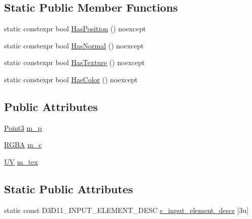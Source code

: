 \subsection*{Static Public Member Functions}
\begin{DoxyCompactItemize}
\item 
static constexpr bool \mbox{\hyperlink{structmage_1_1rendering_1_1_vertex_position_color_texture_a7e63de3d06cc4d0a9fb3f32cde764c9c}{Has\+Position}} () noexcept
\item 
static constexpr bool \mbox{\hyperlink{structmage_1_1rendering_1_1_vertex_position_color_texture_a3823f3163d8350e4c448e99e90cc9436}{Has\+Normal}} () noexcept
\item 
static constexpr bool \mbox{\hyperlink{structmage_1_1rendering_1_1_vertex_position_color_texture_a679323396203b9b47a6ef4c936c72d58}{Has\+Texture}} () noexcept
\item 
static constexpr bool \mbox{\hyperlink{structmage_1_1rendering_1_1_vertex_position_color_texture_a1d3db6f6fb5a93ce596e7157fc204f81}{Has\+Color}} () noexcept
\end{DoxyCompactItemize}
\subsection*{Public Attributes}
\begin{DoxyCompactItemize}
\item 
\mbox{\hyperlink{structmage_1_1_point3}{Point3}} \mbox{\hyperlink{structmage_1_1rendering_1_1_vertex_position_color_texture_a924a25377182f6c29ff7f50fba08113c}{m\+\_\+p}}
\item 
\mbox{\hyperlink{structmage_1_1_r_g_b_a}{R\+G\+BA}} \mbox{\hyperlink{structmage_1_1rendering_1_1_vertex_position_color_texture_acf8f36b78e8366edff1b476e2e97fec5}{m\+\_\+c}}
\item 
\mbox{\hyperlink{structmage_1_1_u_v}{UV}} \mbox{\hyperlink{structmage_1_1rendering_1_1_vertex_position_color_texture_a48cb88cc9c5d68350249e192152a7104}{m\+\_\+tex}}
\end{DoxyCompactItemize}
\subsection*{Static Public Attributes}
\begin{DoxyCompactItemize}
\item 
static const D3\+D11\+\_\+\+I\+N\+P\+U\+T\+\_\+\+E\+L\+E\+M\+E\+N\+T\+\_\+\+D\+E\+SC \mbox{\hyperlink{structmage_1_1rendering_1_1_vertex_position_color_texture_ac9fd3be6b7e8aa81e0ab17720b2a07f6}{s\+\_\+input\+\_\+element\+\_\+descs}} \mbox{[}3u\mbox{]}
\end{DoxyCompactItemize}


